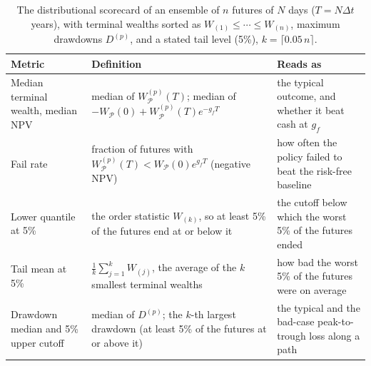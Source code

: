\documentclass[11pt]{article}
\newcommand{\WP}{W_{\mathcal P}}
\begin{document}
\begin{table}[ht]
  \centering
  \caption{The distributional scorecard of an ensemble of $n$ futures of $N$ days ($T=N\Delta t$ years), with terminal wealths sorted as $W_{(1)}\le\cdots\le W_{(n)}$, maximum drawdowns $D^{(p)}$, and a stated tail level (5\%), $k=\lceil0.05\,n\rceil$.}
  \label{tab:metrics}
  \small\sffamily
  \renewcommand{\arraystretch}{1.2}
  \begin{tabular}{@{}>{\RaggedRight}p{}>{\RaggedRight}p{}>{\RaggedRight\arraybackslash}p{}@{}}
    \hline
    \textbf{Metric} & \textbf{Definition} & \textbf{Reads as} \\
    \hline
    Median terminal wealth, median NPV & median of $W^{(p)}_{\mathcal P}(T)$; median of $-\WP(0)+W^{(p)}_{\mathcal P}(T)e^{-g_fT}$ & the typical outcome, and whether it beat cash at $g_f$ \\
    Fail rate & fraction of futures with $W^{(p)}_{\mathcal P}(T)<\WP(0)e^{g_fT}$ (negative NPV) & how often the policy failed to beat the risk-free baseline \\
    Lower quantile at 5\% & the order statistic $W_{(k)}$, so at least 5\% of the futures end at or below it & the cutoff below which the worst 5\% of the futures ended \\
    Tail mean at 5\% & $\frac1k\sum_{j=1}^{k}W_{(j)}$, the average of the $k$ smallest terminal wealths & how bad the worst 5\% of the futures were on average \\
    Drawdown median and 5\% upper cutoff & median of $D^{(p)}$; the $k$-th largest drawdown (at least 5\% of the futures at or above it) & the typical and the bad-case peak-to-trough loss along a path \\
    \hline
  \end{tabular}
\end{table}
\end{document}
